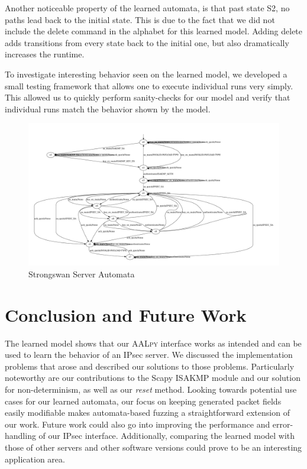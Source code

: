 \documentclass[runningheads]{llncs}
\begin{document}
Another noticeable property of the learned automata, is that past state S2, no paths lead back to the initial state. This is due to the fact that we did not include the delete command in the alphabet for this learned model. Adding delete adds transitions from every state back to the initial one, but also dramatically increases the runtime.

To investigate interesting behavior seen on the learned model, we developed a small testing framework that allows one to execute individual runs very simply. This allowed us to quickly perform sanity-checks for our model and verify that individual runs match the behavior shown by the model.


\begin{figure}[!h]
	\centering
	\includegraphics[width=1\linewidth]{LearnedModel}
	\caption[Learned Model]{Strongswan Server Automata}
	\label{fig:learnedmodel}
\end{figure}

\section{Conclusion and Future Work} \label{chap:6} %
The learned model shows that our \textsc{AALpy} interface works as intended and can be used to learn the behavior of an IPsec server. We discussed the implementation problems that arose and described our solutions to those problems. Particularly noteworthy are our contributions to the Scapy ISAKMP module and our solution for non-determinism, as well as our \emph{reset} method. Looking towards potential use cases for our learned automata, our focus on keeping generated packet fields easily modifiable makes automata-based fuzzing a straightforward extension of our work. Future work could also go into improving the performance and error-handling of our IPsec interface. Additionally, comparing the learned model with those of other servers and other software versions could prove to be an interesting application area. \pagebreak


%
%
%


\end{document}

